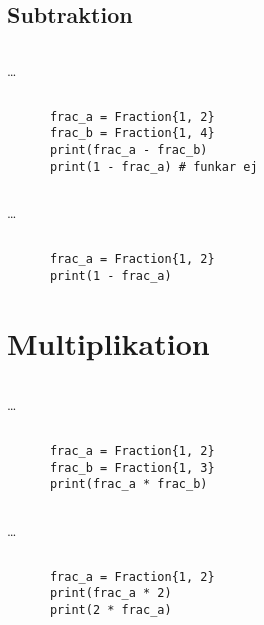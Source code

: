\subsection{Subtraktion}

\begin{frame}[fragile]
  \inputminted[linenos,firstline=3,lastline=3]{python}{examples/myfrac_sub.py}
  \dots
  \inputminted[autogobble=false,linenos,firstline=47,lastline=48]{python}{examples/myfrac_sub.py}

  \begin{example}
    \begin{verbatim}
      frac_a = Fraction{1, 2}
      frac_b = Fraction{1, 4}
      print(frac_a - frac_b)
      print(1 - frac_a) # funkar ej
    \end{verbatim}
  \end{example}
\end{frame}

\begin{frame}[fragile]
  \inputminted[linenos,firstline=3,lastline=3]{python}{examples/myfrac_sub.py}
  \dots
  \inputminted[autogobble=false,linenos,firstline=50,lastline=51]{python}{examples/myfrac_sub.py}

  \begin{example}
    \begin{verbatim}
      frac_a = Fraction{1, 2}
      print(1 - frac_a)
    \end{verbatim}
  \end{example}
\end{frame}


\section{Multiplikation}

\begin{frame}[fragile]
  \inputminted[linenos,firstline=3,lastline=3]{python}{examples/myfrac_mul.py}
  \dots
  \inputminted[autogobble=false,linenos,firstline=53,lastline=59]{python}{examples/myfrac_mul.py}

  \begin{example}
    \begin{verbatim}
      frac_a = Fraction{1, 2}
      frac_b = Fraction{1, 3}
      print(frac_a * frac_b)
    \end{verbatim}
  \end{example}
\end{frame}

\begin{frame}[fragile]
  \inputminted[linenos,firstline=3,lastline=3]{python}{examples/myfrac_mul.py}
  \dots
  \inputminted[autogobble=false,linenos,firstline=61,lastline=62]{python}{examples/myfrac_mul.py}

  \begin{example}
    \begin{verbatim}
      frac_a = Fraction{1, 2}
      print(frac_a * 2)
      print(2 * frac_a)
    \end{verbatim}
  \end{example}
\end{frame}
